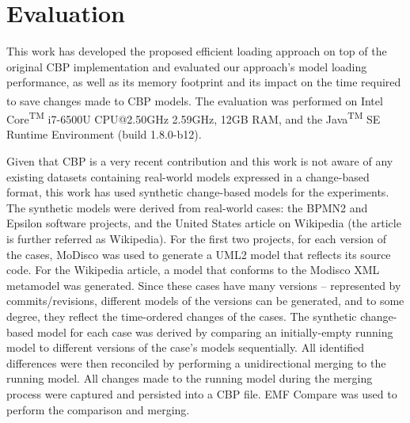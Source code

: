 {\section{Evaluation}
\label{sec:evaluation_4}

This work has developed the proposed efficient loading approach on top of the original CBP implementation \cite{DBLP:conf/models/YohannisKP17,epsilonlabs2019emfcbp} and evaluated our approach's model loading performance, as well as its memory footprint and its impact on the time required to save changes made to CBP models. The evaluation was performed on Intel\textsuperscript{\textregistered} Core\textsuperscript{TM} i7-6500U CPU@2.50GHz 2.59GHz, 12GB RAM, and the Java\textsuperscript{TM} SE Runtime Environment (build 1.8.0-b12).

Given that CBP is a very recent contribution and this work is not aware of any existing datasets containing real-world models expressed in a change-based format, this work has used synthetic change-based models for the experiments. The synthetic models were derived from real-world cases: the BPMN2 \cite{eclipse2017bpmn2,eclipse2018bpmn2git} and Epsilon \cite{eclipse2017epsilon,eclipse2018epsilongit} software projects, and the United States article \cite{wikipedia2018us} on Wikipedia (the article is further referred as Wikipedia). For the first two projects, for each version of the cases, MoDisco \cite{DBLP:journals/infsof/BruneliereCDM14} was used to generate a UML2 \cite{eclipse2017uml2} model that reflects its source code. For the Wikipedia article, a model that conforms to the Modisco XML metamodel \cite{eclipse2018modiscoxml} was generated. Since these cases have many versions -- represented by commits/revisions, different models of the versions can be generated, and to some degree, they reflect the time-ordered changes of the cases. The synthetic change-based model for each case was derived by comparing an initially-empty running model to different versions of the case's models sequentially. All identified differences were then reconciled by performing a unidirectional merging to the running model. All changes made to the running model during the merging process were captured and persisted into a CBP file. EMF Compare was used \cite{eclipse2017compare} to perform the comparison and merging.

}
